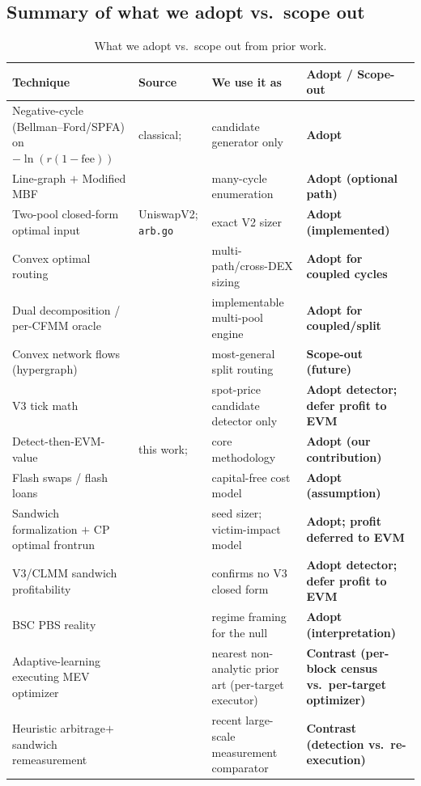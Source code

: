 \documentclass[11pt]{article}
\newcommand{\code}[1]{\texttt{#1}}
\begin{document}
\subsection{Summary of what we adopt vs.\ scope out}
\begin{table}[h]\centering
\caption{What we adopt vs.\ scope out from prior work.}\label{tab:adopt}
\small
\begin{tabular}{p{4.3cm}p{2.6cm}p{3.2cm}p{2.6cm}}
\toprule
Technique & Source & We use it as & Adopt / Scope-out \\
\midrule
Negative-cycle (Bellman--Ford/SPFA) on $-\ln(r(1-\text{fee}))$ & classical;
  \cite{wang2021cyclic} & candidate generator only & \textbf{Adopt} \\
Line-graph $+$ Modified MBF & \cite{zhang2024improved} & many-cycle enumeration &
  \textbf{Adopt (optional path)} \\
Two-pool closed-form optimal input & UniswapV2; \code{arb.go} & exact V2 sizer &
  \textbf{Adopt (implemented)} \\
Convex optimal routing & \cite{angeris2022routing} & multi-path/cross-DEX sizing &
  \textbf{Adopt for coupled cycles} \\
Dual decomposition / per-CFMM oracle & \cite{diamandis2023routing} &
  implementable multi-pool engine & \textbf{Adopt for coupled/split} \\
Convex network flows (hypergraph) & \cite{diamandis2024convexflows} & most-general
  split routing & \textbf{Scope-out (future)} \\
V3 tick math & \cite{adams2021uniswapv3} & spot-price candidate detector only &
  \textbf{Adopt detector; defer profit to EVM} \\
Detect-then-EVM-value & this work; \cite{mclaughlin2023arbitrage} & core methodology
  & \textbf{Adopt (our contribution)} \\
Flash swaps / flash loans & \cite{qin2021flashloans} & capital-free cost model &
  \textbf{Adopt (assumption)} \\
Sandwich formalization $+$ CP optimal frontrun & \cite{zhou2021hft} & seed sizer;
  victim-impact model & \textbf{Adopt; profit deferred to EVM} \\
V3/CLMM sandwich profitability & \cite{gogol2026sandwich} & confirms no V3 closed
  form & \textbf{Adopt detector; defer profit to EVM} \\
BSC PBS reality & \cite{bep322,wang2025binance} & regime framing for the null &
  \textbf{Adopt (interpretation)} \\
Adaptive-learning executing MEV optimizer & \cite{babel2023lanturn} & nearest
  non-analytic prior art (per-target executor) & \textbf{Contrast (per-block census
  vs.\ per-target optimizer)} \\
Heuristic arbitrage$+$sandwich remeasurement & \cite{chi2024remeasuring} & recent
  large-scale measurement comparator & \textbf{Contrast (detection vs.\
  re-execution)} \\
\bottomrule
\end{tabular}
\end{table}
\end{document}
